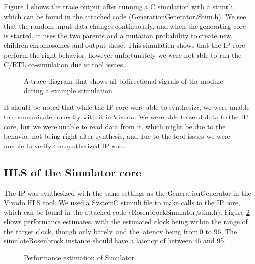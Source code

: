 Figure \ref{fig:generationgeneratortrace} shows the trace output after running a C simulation with a stimuli, which can be found in the attached code (GenerationGenerator/Stim.h). We see that the random input data changes continuously, and when the generating core is started, it uses the two parents and a mutation probability to create new children chromosomes and output these. This simulation shows that the IP core perform the right behavior, however unfortunately we were not able to run the C/RTL co-simulation due to tool issues.

\begin{figure}[h!]
	\centering
	\caption{A trace diagram that shows all bidirectional signals of the module during a example stimulation.}
	\label{fig:generationgeneratortrace}
\end{figure}
\FloatBarrier

It should be noted that while the IP core were able to synthesize, we were unable to communicate correctly with it in Vivado. We were able to send data to the IP core, but we were unable to read data from it, which might be due to the behavior not being right after synthesis, and due to the tool issues we were unable to verify the synthesized IP core.

\subsection{HLS of the Simulator core}

The IP was synthesized with the same settings as the GenerationGenerator in the Vivado HLS tool. We used a SystemC stimuli file to make calls to the IP core, which can be found in the attached code (RosenbrockSimulator/stim.h). Figure \ref{fig:simperformanceestimates} shows performance estimates, with the estimated clock being within the range of the target clock, though only barely, and the latency being from  0 to 96. The simulateRosenbrock instance should have a latency of between 46 and 95. 

\begin{figure}[h!]
	\centering
	\caption{Performance estimation of Simulator}
	\label{fig:simperformanceestimates}
\end{figure}
\FloatBarrier

